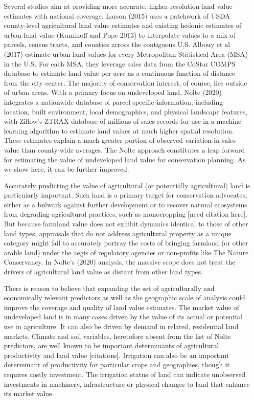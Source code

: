 \documentclass[12pt]{article}
\begin{document}
Several studies aim at providing more accurate, higher-resolution land value estimates with national coverage. Larson (2015) uses a patchwork of USDA county-level agricultural land value estimates and existing hedonic estimates of urban land value (Kuminoff and Pope 2013) to interpolate values to a mix of parcels, census tracts, and counties across the contiguous U.S. Albouy et al (2017) estimate urban land values for every Metropolitan Statistical Area (MSA) in the U.S. For each MSA, they leverage sales data from the CoStar COMPS database to estimate land value per acre as a continuous function of distance from the city center. The majority of conservation interest, of course, lies outside of urban areas. With a primary focus on undeveloped land, Nolte (2020) integrates a nationwide database of parcel-specific information, including location, built environment, local demographics, and physical landscape features, with Zillow’s ZTRAX database of millions of sales records for use in a machine-learning algorithm to estimate land values at much higher spatial resolution. These estimates explain a much greater portion of observed variation in sales value than county-wide averages. The Nolte approach constitutes a leap forward for estimating the value of undeveloped land value for conservation planning. As we show here, it can be further improved.

Accurately predicting the value of agricultural (or potentially agricultural) land is particularly important. Such land is a primary target for conservation advocates, either as a bulwark against further development or to recover natural ecosystems from degrading agricultural practices, such as monocropping [need citation here]. But because farmland value does not exhibit dynamics identical to those of other land types, appraisals that do not address agricultural property as a unique category might fail to accurately portray the costs of bringing farmland (or other arable land) under the aegis of regulatory agencies or non-profits like The Nature Conservancy. In Nolte's (2020) analysis, the massive scope does not treat the drivers of agricultural land value as distant from other land types.

There is reason to believe that expanding the set of agriculturally and economically relevant predictors as well as the geographic scale of analysis could improve the coverage and quality of land value estimates. The market value of undeveloped land is in many cases driven by the value of its actual or potential use in agriculture. It can also be driven by demand in related, residential land markets. Climate and soil variables, heretofore absent from the list of Nolte predictors, are well known to be important determinants of agricultural productivity and land value [citations]. Irrigation can also be an important determinant of productivity for particular crops and geographies, though it requires costly investment. The irrigation status of land can indicate unobserved investments in machinery, infrastructure or physical changes to land that enhance its market value. 
\end{document}
